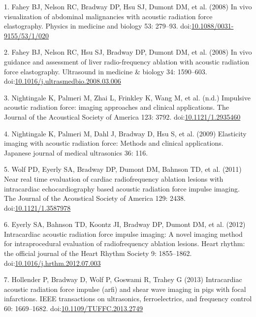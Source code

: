 \documentclass[
]{article}
\newenvironment{cslreferences}%
  {}%
  {\par}
\begin{document}
\hypertarget{refs}{}
\begin{cslreferences}
\leavevmode\hypertarget{ref-Fahey2008a}{}%
1. Fahey BJ, Nelson RC, Bradway DP, Hsu SJ, Dumont DM, et al. (2008) In
vivo visualization of abdominal malignancies with acoustic radiation
force elastography. Physics in medicine and biology 53: 279--93.
doi:\href{https://doi.org/10.1088/0031-9155/53/1/020}{10.1088/0031-9155/53/1/020}

\leavevmode\hypertarget{ref-Fahey2008c}{}%
2. Fahey BJ, Nelson RC, Hsu SJ, Bradway DP, Dumont DM, et al. (2008) In
vivo guidance and assessment of liver radio-frequency ablation with
acoustic radiation force elastography. Ultrasound in medicine \& biology
34: 1590--603.
doi:\href{https://doi.org/10.1016/j.ultrasmedbio.2008.03.006}{10.1016/j.ultrasmedbio.2008.03.006}

\leavevmode\hypertarget{ref-Nightingale2008}{}%
3. Nightingale K, Palmeri M, Zhai L, Frinkley K, Wang M, et al. (n.d.)
Impulsive acoustic radiation force: imaging approaches and clinical
applications. The Journal of the Acoustical Society of America 123:
3792. doi:\href{https://doi.org/10.1121/1.2935460}{10.1121/1.2935460}

\leavevmode\hypertarget{ref-Nightingale2009}{}%
4. Nightingale K, Palmeri M, Dahl J, Bradway D, Hsu S, et al. (2009)
Elasticity imaging with acoustic radiation force: Methods and clinical
applications. Japanese journal of medical ultrasonics 36: 116.

\leavevmode\hypertarget{ref-Wolf2011}{}%
5. Wolf PD, Eyerly SA, Bradway DP, Dumont DM, Bahnson TD, et al. (2011)
Near real time evaluation of cardiac radiofrequency ablation lesions
with intracardiac echocardiography based acoustic radiation force
impulse imaging. The Journal of the Acoustical Society of America 129:
2438. doi:\href{https://doi.org/10.1121/1.3587978}{10.1121/1.3587978}

\leavevmode\hypertarget{ref-Eyerly2012}{}%
6. Eyerly SA, Bahnson TD, Koontz JI, Bradway DP, Dumont DM, et al.
(2012) Intracardiac acoustic radiation force impulse imaging: A novel
imaging method for intraprocedural evaluation of radiofrequency ablation
lesions. Heart rhythm: the official journal of the Heart Rhythm Society
9: 1855--1862.
doi:\href{https://doi.org/10.1016/j.hrthm.2012.07.003}{10.1016/j.hrthm.2012.07.003}

\leavevmode\hypertarget{ref-Hollender2013}{}%
7. Hollender P, Bradway D, Wolf P, Goswami R, Trahey G (2013)
Intracardiac acoustic radiation force impulse (arfi) and shear wave
imaging in pigs with focal infarctions. IEEE transactions on
ultrasonics, ferroelectrics, and frequency control 60: 1669--1682.
doi:\href{https://doi.org/10.1109/TUFFC.2013.2749}{10.1109/TUFFC.2013.2749}


\end{cslreferences}
\end{document}
